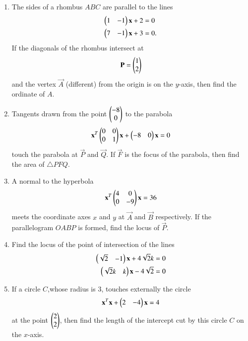 \documentclass[journal,12pt,twocolumn]{IEEEtran}
\renewcommand\thesection{\arabic{section}}
\begin{document}
\begin{enumerate}[label=\thesection.\arabic*
,ref=\thesection.\theenumi]
%
at the points
\begin{equation}
\myvec{3\cos\theta\\ \sqrt{3}\sin \theta},
\myvec{-3\sin\theta\\ \sqrt{3}\cos \theta}, \quad \theta \in \brak{0,\frac{\pi}{2}},
\end{equation}
then find $\frac{2\cot \beta}{\sin 2\theta}$.
\item The sides of a rhombus $ABC$ are parallel to the lines
\begin{align}
\begin{pmatrix}1 & -1\end{pmatrix}\mathbf{x} + 2 &=0
\\
\begin{pmatrix}7 & -1\end{pmatrix}\mathbf{x} + 3 &=0.
\end{align}
If the diagonals of the rhombus intersect at
\begin{align}
\mathbf{P} = \begin{pmatrix}1 \\ 2\end{pmatrix}
\end{align}
and the vertex $\vec{A}$ (different) from the origin is on the $y$-axis, then find the ordinate of $A$.
\item Tangents drawn from the point $\begin{pmatrix}-8\\0\end{pmatrix}$ to the parabola
\begin{equation}
\mathbf{x}^T\begin{pmatrix}0 & 0 \\ 0 & 1\end{pmatrix}\mathbf{x} + \begin{pmatrix}-8 & 0\end{pmatrix}\mathbf{x} 
 = 0
\end{equation}
%
touch the parabola at $\vec{P}$ and  $\vec{Q}$. If $\vec{F}$ is the focus of the parabola, then find the area 
of $\triangle PFQ$.
\item A normal to the hyperbola 
\begin{equation}
\mathbf{x}^T\begin{pmatrix}4 & 0 \\ 0 & -9\end{pmatrix}\mathbf{x} 
 = 36
\end{equation}
%
meets the coordinate axes $x$ and $y$ at $\vec{A}$ and $\vec{B}$ respectively.  If the parallelogram $OABP$ is 
formed, find the locus of $\vec{P}$.
\item Find the locus of the point of intersection of the lines
\begin{align}
\begin{pmatrix}\sqrt{2} & -1 \end{pmatrix}\mathbf{x} + 4 \sqrt{2}k &= 0
\\
\begin{pmatrix}\sqrt{2}k & k \end{pmatrix}\mathbf{x} - 4 \sqrt{2} &= 0
\end{align}
\item If a circle $C$,whose radius is 3, touches externally the circle 
\begin{equation}
\mathbf{x}^T\mathbf{x} + \begin{pmatrix}2 & -4\end{pmatrix}\mathbf{x} = 4
\end{equation}
%
at the point $\begin{pmatrix}2\\2\end{pmatrix}$, then find the length of the intercept cut by this circle $C$ on the $x$-axis.
\end{enumerate}
\end{document}
